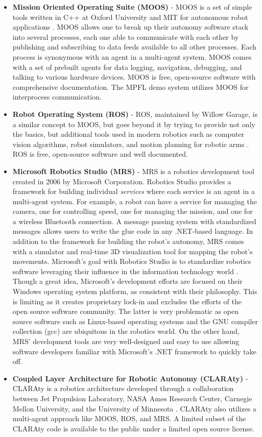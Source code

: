 \begin{itemize}
\item \textbf{Mission Oriented Operating Suite (MOOS)} - MOOS is a set of simple tools written in C++ at Oxford University and MIT for autonomous robot applications \citep{newman:moos}. MOOS allows one to break up their autonomy software stack into several processes, each one able to communicate with each other by publishing and subscribing to data feeds available to all other processes. Each process is synonymous with an agent in a multi-agent system. MOOS comes with a set of prebuilt agents for data logging, navigation, debugging, and talking to various hardware devices. MOOS is free, open-source software with comprehensive documentation. The MPFL demo system utilizes MOOS for interprocess communication.
\item \textbf{Robot Operating System (ROS)} - ROS, maintained by Willow Garage, is a similar concept to MOOS, but goes beyond it by trying to provide not only the basics, but additional tools used in modern robotics such as computer vision algorithms, robot simulators, and motion planning for robotic arms \citep{quigley:ros}. ROS is free, open-source software and well documented.
\item \textbf{Microsoft Robotics Studio (MRS)} - MRS is a robotics development tool created in 2006 by Microsoft Corporation. Robotics Studio provides a framework for building individual \textit{services} where each service is an agent in a multi-agent system. For example, a robot can have a service for managing the camera, one for controlling speed, one for managing the mission, and one for a wireless Bluetooth connection. A message passing system with standardized messages allows users to write the glue code in any .NET-based language. In addition to the framework for building the robot's autonomy, MRS comes with a simulator and real-time 3D visualization tool for mapping the robot's movements. Microsoft's goal with Robotics Studio is to standardize robotics software leveraging their influence in the information technology world \citep{jackson:msrobotics}. Though a great idea, Microsoft's development efforts are focused on their Windows operating system platform, as consistent with their philosophy. This is limiting as it creates proprietary lock-in and excludes the efforts of the open source software community. The latter is very problematic as open source software such as Linux-based operating systems and the GNU compiler collection (gcc) are ubiquitous in the robotics world. On the other hand, MRS' development tools are very well-designed and easy to use allowing software developers familiar with Microsoft's .NET framework to quickly take off.
\item \textbf{Coupled Layer Architecture for Robotic Autonomy
(CLARAty)} - CLARAty is a robotics architecture developed through a collaboration between Jet Propulsion Laboratory, NASA Ames Research Center, Carnegie Mellon University, and the University of Minnesota \citep{volpe:claraty}. CLARAty also utilizes a multi-agent approach like MOOS, ROS, and MRS. A limited subset of the CLARAty code is available to the public under a limited open source license.
\end{itemize}


